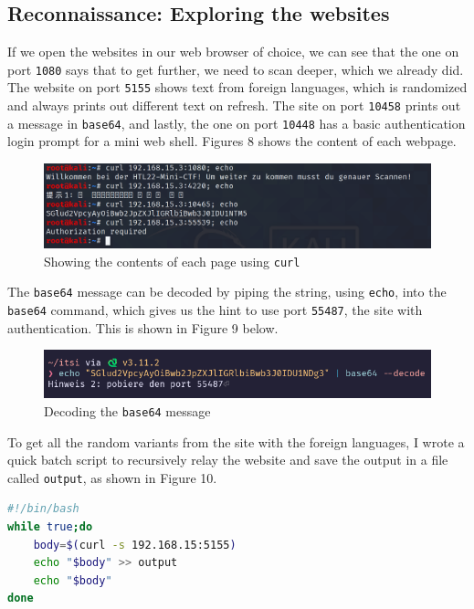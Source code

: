 \documentclass[a4paper]{article}
\newcommand{\abc}{\hfill \break}
\begin{document}
\subsection{Reconnaissance: Exploring the websites}
If we open the websites in our web browser of choice, we can see that the one on port \texttt{1080} says that to get further, we need to scan deeper, which we already did. The website on port \texttt{5155} shows text from foreign languages, which is randomized and always prints out different text on refresh. The site on port \texttt{10458} prints out a message in \texttt{base64}, and lastly, the one on port \texttt{10448} has a basic authentication login prompt for a mini web shell. Figures 8 shows the content of each webpage.
\newpage
\begin{figure}[h]
	\includegraphics[scale=0.25]{images/allesiten.png}
	\centering
	\caption[Showing the contents of each page using curl]{Showing the contents of each page using \texttt{curl} \footnotemark}
\end{figure}\abc
{}
The \texttt{base64} message can be decoded by piping the string, using \texttt{echo}, into the \texttt{base64} command, which gives us the hint to use port \texttt{55487}, the site with authentication. This is shown in Figure 9 below.
\begin{figure}[h]
	\includegraphics[scale=0.4]{images/base64.png}
	\centering
	\caption{Decoding the \texttt{base64} message}
\end{figure}\abc
To get all the random variants from the site with the foreign languages, I wrote a quick batch script to recursively relay the website and save the output in a file called \texttt{output}, as shown in Figure 10.
\begin{lstlisting}[language=bash]
#!/bin/bash
while true;do
    body=$(curl -s 192.168.15:5155)
    echo "$body" >> output
    echo "$body"
done
\end{lstlisting}
\end{document}
